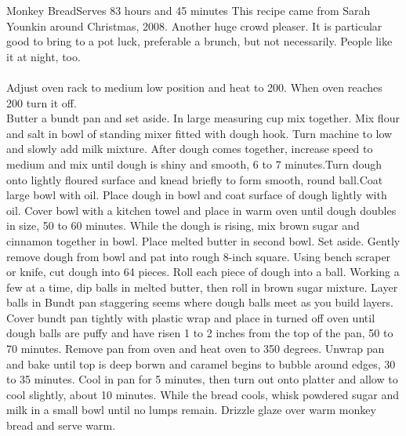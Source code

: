 \begin{recipe}{Monkey Bread}{Serves 8}{3 hours and 45 minutes}
\freeform This recipe came from Sarah Younkin around Christmas, 2008.  Another huge crowd pleaser.  It is particular good to bring to a pot luck, preferable a brunch, but not necessarily.  People like it at night, too.\\\\
Adjust oven rack to medium low position and heat to 200\0.  When oven reaches 200\0 turn it off.\\
Butter a bundt pan and set aside.
In large measuring cup mix together.
Mix flour and salt in bowl of standing mixer fitted with dough hook.
\freeform
Turn machine to low and slowly add milk mixture.  After dough comes
together, increase speed to medium and mix until dough is shiny and
smooth, 6 to 7 minutes.Turn dough onto lightly floured surface and
knead briefly to form smooth, round ball.Coat large bowl with
oil. Place dough in bowl and coat surface of dough lightly with oil.
Cover bowl with a kitchen towel and place in warm oven until dough
doubles in size, 50 to 60 minutes.
While the dough is rising, mix brown sugar and cinnamon together in bowl. Place melted butter in second bowl. Set aside.
\freeform
Gently remove dough from bowl and pat into rough 8-inch square. Using
bench scraper or knife, cut dough into 64 pieces. Roll each piece of
dough into a ball. Working a few at a time, dip balls in melted
butter, then roll in brown sugar mixture. Layer balls in Bundt pan
staggering seems where dough balls meet as you build layers. Cover
bundt pan tightly with plastic wrap and place in turned off oven until
dough balls are puffy and have risen 1 to 2 inches from the top of the
pan, 50 to 70 minutes. Remove pan from oven and heat oven to 350
degrees. Unwrap pan and bake until top is deep borwn and caramel
begins to bubble around edges, 30 to 35 minutes. Cool in pan for 5
minutes, then turn out onto platter and allow to cool slightly, about
10 minutes.
While the bread cools, whisk powdered sugar and milk in a small bowl until no lumps remain. Drizzle glaze over warm monkey bread and serve warm. 
\end{recipe}
